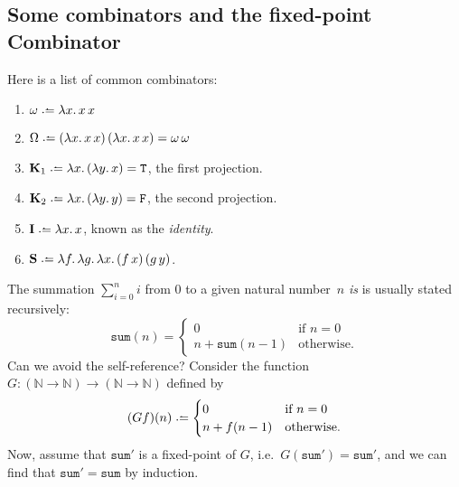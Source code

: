 \subsection{Some combinators and the fixed-point Combinator}
Here is a list of common combinators:
\begin{enumerate}
  \item $\omega \defeq \lambda x.\, x\,x$
  \item $\Omega \defeq (\lambda x.\, x\,x)\,(\lambda x.\,x\,x)
    = \omega\,\omega$
  \item $\mathbf{K}_1 \defeq \lambda x.\,(\lambda y.\,
    x) = \mathtt{T}$, the first projection.
  \item $\mathbf{K}_2 \defeq \lambda x.\,(\lambda y.\,
    y) = \mathtt{F}$, the second projection.
  \item $\mathbf{I} \defeq \lambda x.\, x$, known as the \emph{identity}.
  \item $\mathbf{S}\defeq\lambda f.\,\lambda g.\,\lambda x.\, 
    (f\,x)\,(g\,y)$.
\end{enumerate}
\begin{example}
  The summation $\sum_{i = 0}^{n} i$ from $0$ to a given natural number~$n$
  \emph{is} is usually stated recursively:
  \[
    \mathtt{sum}(n) =
      \begin{cases} 
       0 & \text{if } n = 0 \\
       n + \mathtt{sum}(n - 1)  & \text{otherwise}.
      \end{cases}
  \]
  Can we avoid the self-reference? Consider the function
  $G\colon (\mathbb{N} \to \mathbb{N}) \to (\mathbb{N} \to \mathbb{N})$
  defined by
  \begin{equation} \label{eq:summation}
    (Gf)(n) \defeq
    \begin{cases}
       0 & \text{if } n = 0 \\
       n + f(n - 1)  & \text{otherwise}.
    \end{cases}
  \end{equation}
  Now, assume that $\mathtt{sum}'$ is a fixed-point of $G$, i.e.\
  $G(\mathtt{sum}') =\mathtt{sum}'$, and we can find that $\mathtt{sum}' =
  \mathtt{sum}$ by induction. 
\end{example}

